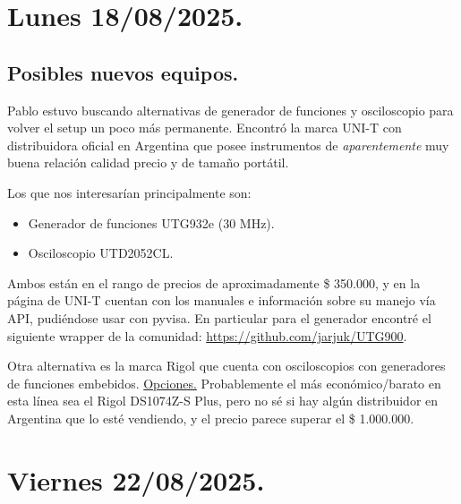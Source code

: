 \section{Lunes 18/08/2025.} 

\subsection*{Posibles nuevos equipos.} 
Pablo estuvo buscando alternativas de generador de funciones y osciloscopio para volver el setup un poco más permanente. Encontró la marca UNI-T con distribuidora oficial en Argentina que posee instrumentos de \textit{aparentemente} muy buena relación calidad precio y de tamaño portátil. 

Los que nos interesarían principalmente son: 
\begin{itemize}
	\item Generador de funciones UTG932e (30 MHz). 
	\item Osciloscopio UTD2052CL. 
\end{itemize}

Ambos están en el rango de precios de aproximadamente \$ 350.000, y en la página de UNI-T cuentan con los manuales e información sobre su manejo vía API, pudiéndose usar con pyvisa. En particular para el generador encontré el siguiente wrapper de la comunidad: \url{https://github.com/jarjuk/UTG900}.    

Otra alternativa es la marca Rigol que cuenta con osciloscopios con generadores de funciones embebidos. \href{https://www.rigolna.com/products/digital-oscilloscopes/1000z/?srsltid=AfmBOooyiYs5EehPOwh3nspDsWKO8ZRaz3G0OwuuPlwIOZEdBgH4wbH2}{Opciones.} Probablemente el más económico/barato en esta línea sea el Rigol DS1074Z-S Plus, pero no sé si hay algún distribuidor en Argentina que lo esté vendiendo, y el precio parece superar el \$ 1.000.000.  

\section{Viernes 22/08/2025.} 

